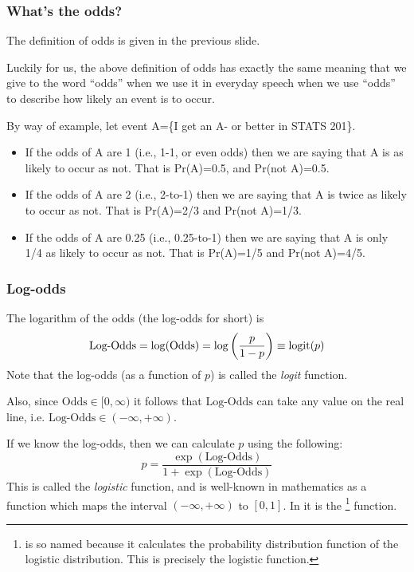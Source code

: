 \documentclass{beamer}\usepackage[]{graphicx}\usepackage[]{xcolor}
\begin{document}
\begin{frame}
\frametitle{What's the odds?}
The definition of odds is given in the previous slide.
\medskip

Luckily for us, the above definition of odds
has exactly the same meaning that we give to the word ``odds'' when we use it in
everyday speech when we use ``odds'' to describe how likely an event is to occur.
\bigskip

By way of example, let event A=\{I get an A- or better in STATS 201\}.
\medskip

\begin{itemize}
\item If the odds of A are 1 (i.e., 1-1, or even odds) then we are saying that
A is as likely to occur as not. That is Pr(A)=0.5, and Pr(not A)=0.5.
\item If the odds of A are 2 (i.e., 2-to-1) then we are saying that A is twice as likely to occur as not. That is Pr(A)=2/3 and Pr(not A)=1/3.
\item If the odds of A are 0.25 (i.e., 0.25-to-1) then we are saying that A is only 1/4
as likely to occur as not. That is Pr(A)=1/5 and Pr(not A)=4/5.
\end{itemize}
\end{frame}



\begin{frame}
\frametitle{Log-odds}

The logarithm of the odds (the log-odds for short) is
\[
\text{Log-Odds} = \log(\text{Odds}) = \log\left(\frac{p}{1-p}\right) \equiv \operatorname{logit}(p)
\]
Note that the log-odds (as a function of $p$) is called the \emph{logit} function.

Also, since $\text{Odds} \in [0,\infty)$ it follows that $\text{Log-Odds}$ can take any value on the real line, i.e. $\text{Log-Odds} \in (-\infty,+\infty)$.
\medskip

If we know the log-odds, then we can calculate $p$ using the following:
\[
p = \frac{\exp(\text{Log-Odds})}{1 + \exp(\text{Log-Odds})}
\]
This is called the \emph{logistic} function, and is well-known in mathematics as a function which maps the interval $(-\infty,+\infty)$ to $[0,1]$. In  it is the \footnote{ is so named because it calculates the probability distribution function of the logistic distribution. This is precisely the logistic function.} function.
\end{frame}


\end{document}

